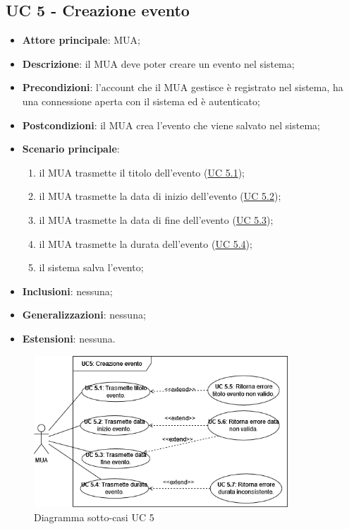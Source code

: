 \subsection{UC 5 - Creazione evento} \label{sec:UC5}
    \begin{itemize}
        \item \textbf{Attore principale}: MUA;
        \item \textbf{Descrizione}: il MUA deve poter creare un evento nel sistema;
        \item \textbf{Precondizioni}: l’account che il MUA gestisce è registrato nel sistema, ha una connessione aperta con il sistema ed è autenticato;
        \item \textbf{Postcondizioni}: il MUA crea l'evento che viene salvato nel sistema;
        \item \textbf{Scenario principale}:
            \begin{enumerate}
                \item il MUA trasmette il titolo dell'evento (\hyperref[sec:UC5.1]{UC 5.1});
                \item il MUA trasmette la data di inizio dell'evento (\hyperref[sec:UC5.2]{UC 5.2});
                \item il MUA trasmette la data di fine dell'evento (\hyperref[sec:UC5.3]{UC 5.3});
                \item il MUA trasmette la durata dell'evento (\hyperref[sec:UC5.4]{UC 5.4});
                \item il sistema salva l'evento;
            \end{enumerate}
        \item \textbf{Inclusioni}: nessuna;
        \item \textbf{Generalizzazioni}: nessuna;
        \item \textbf{Estensioni}: nessuna.
    \end{itemize}

\begin{figure}[H]
    \includegraphics[width=0.85\textwidth]{sections/uc_imgs/UC05.png}
    \centering
    \caption{Diagramma sotto-casi UC 5}
\end{figure}

